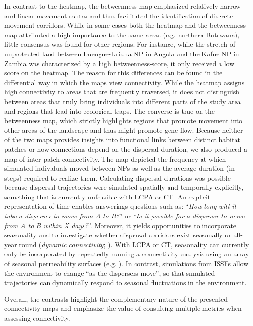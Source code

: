 \documentclass[abstract=on,10pt,a4paper,bibliography=totocnumbered]{article}
\begin{document}
In contrast to the heatmap, the betweenness map emphasized relatively narrow and
linear movement routes and thus facilitated the identification of discrete
movement corridors. While in some cases both the heatmap and the betweenness map
attributed a high importance to the same areas (e.g. northern Botswana), little
consensus was found for other regions. For instance, while the stretch of
unprotected land between Luengue-Luiana NP in Angola and the Kafue NP in Zambia
was characterized by a high betweenness-score, it only received a low score on
the heatmap. The reason for this differences can be found in the differential
way in which the maps view connectivity. While the heatmap assigns high
connectivity to areas that are frequently traversed, it does not distinguish
between areas that truly bring individuals into different parts of the study
area and regions that lead into ecological traps. The converse is true on the
betweenness map, which strictly highlights regions that promote movement into
other areas of the landscape and thus might promote gene-flow. Because neither
of the two maps provides insights into functional links between distinct habitat
patches or how connections depend on the dispersal duration, we also produced a
map of inter-patch connectivity. The map depicted the frequency at which
simulated individuals moved between NPs as well as the average duration (in
steps) required to realize them. Calculating dispersal durations was possible
because dispersal trajectories were simulated spatially and temporally
explicitly, something that is currently unfeasible with LCPA or CT. An explicit
representation of time enables answerings questions such as: ``\textit{How long
will it take a disperser to move from A to B?}'' or ``\textit{Is it possible for
a disperser to move from A to B within X days?}''. Moreover, it yields
opportunities to incorporate seasonality and to investigate whether dispersal
corridors exist seasonally or all-year round (\textit{dynamic connectivity};
\citealp{Zeller.2020}). With LCPA or CT, seasonality can currently only be
incorporated by repeatedly running a connectivity analysis using an array of
seasonal permeability surfaces (e.g. \citealp{Benz.2016, Osipova.2019}). In
contrast, simulations from ISSFs allow the environment to change ``as the
dispersers move'', so that simulated trajectories can dynamically respond to
seasonal fluctuations in the environment.

Overall, the contrasts highlight the complementary nature of the presented
connectivity maps and emphasize the value of consulting multiple metrics when
assessing connectivity.
\end{document}
